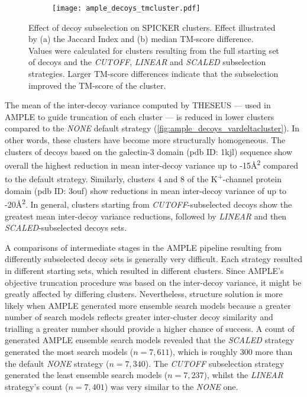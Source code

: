 \begin{figure}[H]\ContinuedFloat
    \begin{subfigure}[b]{\textwidth}
        \texttt{[image: ample\_decoys\_tmcluster.pdf]}
        \caption{}
        \label{fig:ample_decoys_tmcluster}
    \end{subfigure}
    \caption[Effect of decoy subselection on SPICKER clusters]{Effect of decoy subselection on SPICKER clusters. Effect illustrated by (a) the Jaccard Index and (b) median TM-score difference. Values were calculated for clusters resulting from the full starting set of decoys and the \textit{CUTOFF}, \textit{LINEAR} and \textit{SCALED} subselection strategies. Larger TM-score differences indicate that the subselection improved the TM-score of the cluster.}
\end{figure}

The mean of the inter-decoy variance computed by THESEUS --- used in AMPLE to guide truncation of each cluster --- is reduced in lower clusters compared to the \textit{NONE} default strategy (\cref{fig:ample_decoys_vardeltacluster}). In other words, these clusters have become more structurally homogeneous. The clusters of decoys based on the galectin-3 domain (\gls{pdb} ID: 1kjl) sequence show overall the highest reduction in mean inter-decoy variance up to -15\AA\textsuperscript{2} compared to the default strategy. Similarly, clusters 4 and 8 of the K\textsuperscript{+}-channel protein domain (\gls{pdb} ID: 3ouf) show reductions in mean inter-decoy variance of up to -20\AA\textsuperscript{2}. In general, clusters starting from \textit{CUTOFF}-subselected decoys show the greatest mean inter-decoy variance reductions, followed by \textit{LINEAR} and then \textit{SCALED}-subselected decoys sets.

A comparisons of intermediate stages in the AMPLE pipeline resulting from differently subselected decoy sets is generally very difficult. Each strategy resulted in different starting sets, which resulted in different clusters. Since AMPLE's objective truncation procedure was based on the inter-decoy variance, it might be greatly affected by differing clusters. Nevertheless, structure solution is more likely when AMPLE generated more ensemble search models because a greater number of search models reflects greater inter-cluster decoy similarity and trialling a greater number should provide a higher chance of success. A count of generated AMPLE ensemble search models revealed that the \textit{SCALED} strategy generated the most search models ($n=7,611$), which is roughly 300 more than the default \textit{NONE} strategy ($n=7,340$). The \textit{CUTOFF} subselection strategy generated the least ensemble search models ($n=7,237$), whilst the \textit{LINEAR} strategy's count ($n=7,401$) was very similar to the \textit{NONE} one.

